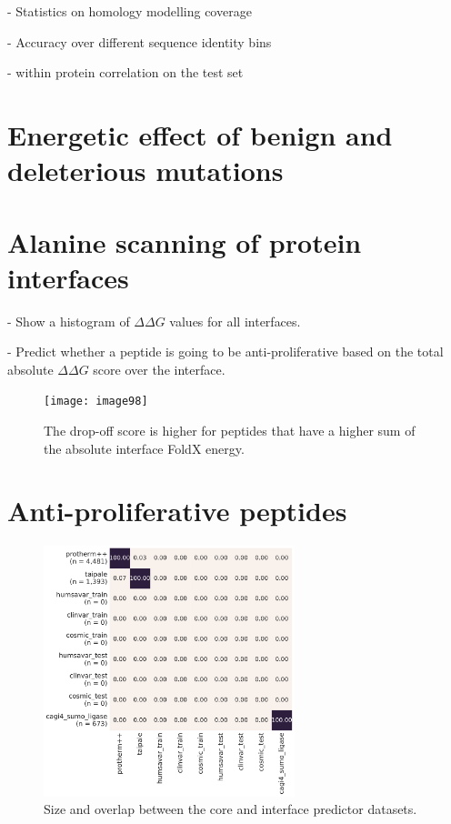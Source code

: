 
 \label{chap:results}

- Statistics on homology modelling coverage

- Accuracy over different sequence identity bins

- within protein correlation on the test set


\section{Energetic effect of benign and deleterious mutations}



\section{Alanine scanning of protein interfaces}

- Show a histogram of $\Delta \Delta G$ values for all interfaces.

- Predict whether a peptide is going to be anti-proliferative based on the total absolute $\Delta \Delta G$ score over the interface.


\begin{figure}[H]
	\centering
	\texttt{[image: image98]}
	\caption[pipeline]{The drop-off score is higher for peptides that have a higher sum of the absolute interface FoldX energy.}
\end{figure}



\section{Anti-proliferative peptides}

\clearpage



\begin{figure}[ht]
	\centering
	\includegraphics[width=0.65\textwidth]{static/elaspic_training_set/data_statistics/training_set_overlap_data_df_core.pdf}
	\caption{Size and overlap between the core and interface predictor datasets.}
\end{figure}


